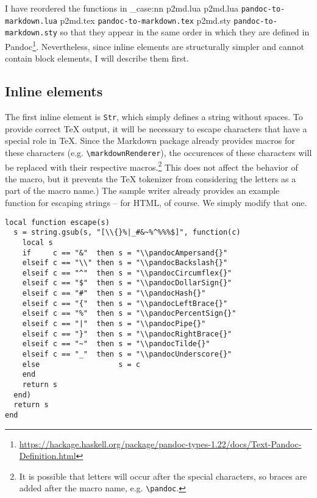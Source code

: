 \documentclass[
  digital,     %
  oneside,     %
  nosansbold,  %
  nocolorbold, %
  lof,         %
  nolot,       %
]{fithesis4}
\newcommand\macro[1]{\texttt{\textbackslash{}{#1}}}
\newcommand\pandoc[1]{\macro{pandoc\-{#1}}}
\newcommand\renderer[1]{\macro{markdown\-Renderer\-{#1}}}
\newcommand\file[1]
  {
    \str_case:nn
      { #1 }
      {
        { p2md.lua } { \texttt{pandoc\hyp{}to\hyp{}markdown.lua} }
        { p2md.tex } { \texttt{pandoc\hyp{}to\hyp{}markdown.tex} }
        { p2md.sty } { \texttt{pandoc\hyp{}to\hyp{}markdown.sty} }
      }
  }
\begin{document}
I have reordered the functions in \file{p2md.lua} so that they appear in the same order in which they are defined in Pandoc\footnote{\url{https://hackage.haskell.org/package/pandoc-types-1.22/docs/Text-Pandoc-Definition.html}}. Nevertheless, since inline elements are structurally simpler and cannot contain block elements, I will describe them first.

\subsection{Inline elements}

The first inline element is \texttt{Str}, which simply defines a string without spaces. To provide correct \TeX{} output, it will be necessary to escape characters that have a special role in \TeX{}. Since the Markdown package already provides macros for these characters (e.g. \renderer{Backslash}), the occurences of these characters will be replaced with their respective macros.\footnote{It is possible that letters will occur after the special characters, so braces are added after the macro name, e.g. \pandoc{Backslash\{\}}.} This does not affect the behavior of the macro, but it prevents the \TeX{} tokenizer from considering the letters as a part of the macro name.) The sample writer already provides an example function for escaping strings -- for HTML, of course. We simply modify that one.

\noindent
\lstset{language=[5.3]Lua}
\begin{lstlisting}
local function escape(s)
  s = string.gsub(s, "[\\{}%|_#&~%^%%%$]", function(c)
    local s
    if     c == "&"  then s = "\\pandocAmpersand{}"
    elseif c == "\\" then s = "\\pandocBackslash{}"
    elseif c == "^"  then s = "\\pandocCircumflex{}"
    elseif c == "$"  then s = "\\pandocDollarSign{}"
    elseif c == "#"  then s = "\\pandocHash{}"
    elseif c == "{"  then s = "\\pandocLeftBrace{}"
    elseif c == "%"  then s = "\\pandocPercentSign{}"
    elseif c == "|"  then s = "\\pandocPipe{}"
    elseif c == "}"  then s = "\\pandocRightBrace{}"
    elseif c == "~"  then s = "\\pandocTilde{}"
    elseif c == "_"  then s = "\\pandocUnderscore{}"
    else                  s = c
    end
    return s
  end)
  return s
end
\end{lstlisting}
\end{document}
